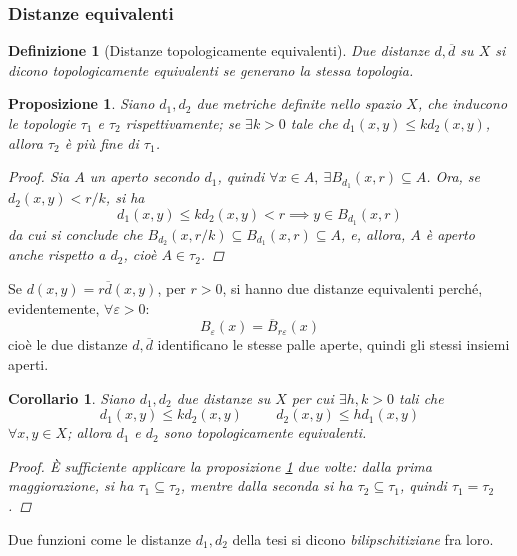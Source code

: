 \documentclass[12pt]{scrartcl}
\theoremstyle{style}
\newtheorem{definizione}{Definizione}[section]
\newtheorem{prop}{Proposizione}[section]
\newtheorem{corollario}{Corollario}[teorema]
\numberwithin{equation}{subsection}
\begin{document}
\subsubsection{Distanze equivalenti}
\begin{definizione}
	[Distanze topologicamente equivalenti]
	Due distanze $d,\overline{d}$ su $X$ si dicono \textit{topologicamente equivalenti} se generano la stessa topologia.
\end{definizione}
\begin{prop}\label{dfin}
	Siano $d_1,d_2$ due metriche definite nello spazio $X$, che inducono le topologie $\tau _1$ e $\tau _2$ rispettivamente; se $\exists k>0$ tale che $d_1(x,y) \le kd_2(x,y)$, allora $\tau _2$ \`e pi\`u fine di $\tau _1$.
	\begin{proof}
		Sia $A$ un aperto secondo $d_1$, quindi $\forall x \in A, \ \exists B_{d_1} (x,r) \subseteq A$.
		Ora, se $d_2(x,y) < r / k$, si ha 
		\[
		d_1(x,y) \le k d_2(x,y) < r \implies y \in B_{d_1} (x,r)
		\] 
		da cui si conclude che $B_{d_2} (x,r / k) \subseteq B_{d_1} (x,r) \subseteq A$, e, allora, $A$ \`e aperto anche rispetto a $d_2$, cio\`e $A \in \tau _2$.
		
	\end{proof}
\end{prop}
\noindent Se $d(x,y) = r\overline{d}(x,y)$, per $r>0$, si hanno due distanze equivalenti perch\'e, evidentemente, $\forall \varepsilon >0$:
\[
B_\varepsilon (x) = \overline{B}_{r\varepsilon } (x)
\] 
cio\`e le due distanze $d,\overline{d}$ identificano le stesse palle aperte, quindi gli stessi insiemi aperti.
\begin{corollario}
	Siano $d_1,d_2$ due distanze su $X$ per cui $\exists h,k>0$ tali che 
	\[
	d_1(x,y) \le kd_2(x,y) \hspace{1cm} d_2(x,y) \le hd_1(x,y)
	\] 
	$\forall x,y \in X$; allora $d_1$ e $d_2$ sono topologicamente equivalenti.
	\begin{proof}
		\`E sufficiente applicare la proposizione \ref{dfin} due volte: dalla prima maggiorazione, si ha $\tau _1 \subseteq \tau _2$, mentre dalla seconda si ha $\tau _2 \subseteq \tau _1$, quindi $\tau _1 = \tau _2$.
	\end{proof}
\end{corollario}
\noindent Due funzioni come le distanze $d_1,d_2$ della tesi si dicono \textit{bilipschitiziane} fra loro.
\end{document}

